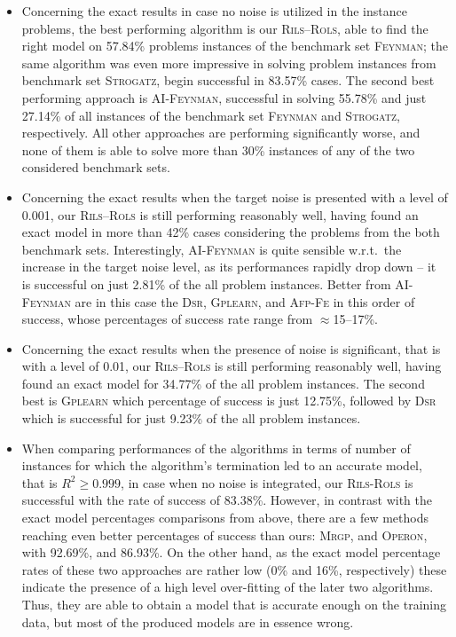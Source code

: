 \documentclass[a4paper,12pt]{elsarticle}
\begin{document}
\begin{itemize}
	\item Concerning the exact results in case no noise is utilized in the instance problems, the best performing algorithm is our \textsc{Rils}--\textsc{Rols}, able to find the right model on 57.84\% problems instances of the benchmark set \textsc{Feynman}; the same algorithm was even more impressive in solving problem instances from benchmark set \textsc{Strogatz}, begin successful in 83.57\% cases. The second best performing  approach is \textsc{AI-Feynman}, successful in solving 55.78\% and just 27.14\% of all instances of the benchmark set \textsc{Feynman} and \textsc{Strogatz}, respectively. All other approaches are performing significantly worse, and none of them is able to solve more than 30\% instances of any of the two considered benchmark sets. 
	\item   Concerning the exact results when the target noise is presented with a level of 0.001, our \textsc{Rils}--\textsc{Rols} is still performing reasonably well, having found an exact model in more than 42\% cases considering the problems from the both benchmark sets. Interestingly, \textsc{AI-Feynman} is quite sensible w.r.t.\ the increase in the target noise level, as its performances rapidly drop down -- it is successful on just 2.81\% of the all problem instances. Better from \textsc{AI-Feynman} are in this case the \textsc{Dsr}, \textsc{Gplearn}, and \textsc{Afp-Fe} in this order of success, whose percentages of success rate range from $\approx$15--17\%. 
	\item  Concerning the exact results when the presence of noise is significant, that is with a level of 0.01,  our \textsc{Rils}--\textsc{Rols} is still performing reasonably well, having found an exact model for  34.77\% of the all problem instances. The second best is \textsc{Gplearn} which percentage of success is just 12.75\%, followed by \textsc{Dsr} which is successful for just 9.23\% of the all problem instances. 

	\item When comparing performances of the algorithms in terms of number of instances for which the algorithm's termination led to an accurate model, that is $R^2 \geq 0.999$, in case when no noise is integrated, our \textsc{Rils}-\textsc{Rols} is successful with the rate of success of 83.38\%. However, in contrast with the exact model percentages comparisons from above, there are a few methods reaching even better percentages of success than ours: \textsc{Mrgp}, and \textsc{Operon}, with 92.69\%, and 86.93\%. On the other hand, as the  exact model percentage rates of these two approaches are rather low (0\% and 16\%, respectively) these indicate the presence of a high level over-fitting  of the later two algorithms. Thus, they are able to obtain a model that is accurate enough on the training data, but most of the produced models are in essence wrong.
	

\end{itemize}
\end{document}
